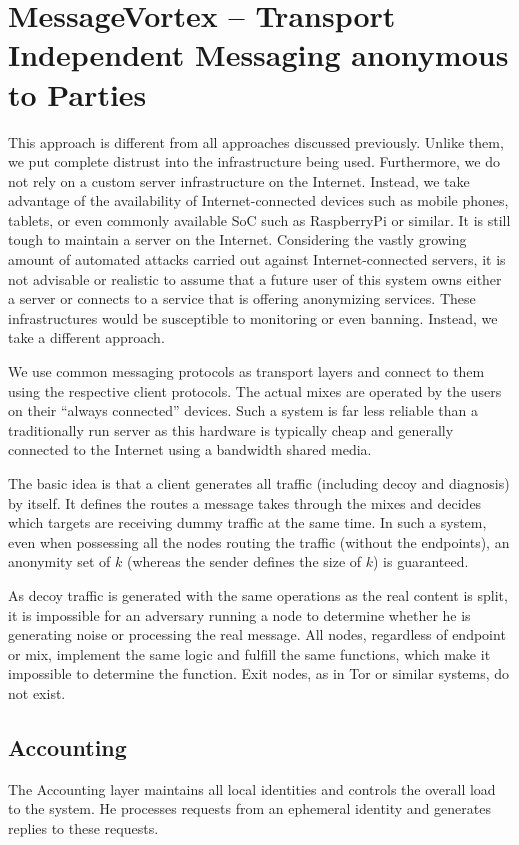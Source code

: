 \chapter{MessageVortex -- Transport Independent Messaging anonymous to \texorpdfstring{}{3rd} Parties\label{sec:spec}}
This approach is different from all approaches discussed previously. Unlike them, we put complete distrust into the infrastructure being used. Furthermore, we do not rely on a custom server infrastructure on the Internet. Instead, we take advantage of the availability of Internet-connected devices such as mobile phones, tablets, or even commonly available SoC such as RaspberryPi or similar. It is still tough to maintain a server on the Internet. Considering the vastly growing amount of automated attacks carried out against Internet-connected servers, it is not advisable or realistic to assume that a future user of this system owns either a server or connects to a service that is offering anonymizing services. These infrastructures would be susceptible to monitoring or even banning. Instead, we take a different approach.

We use common messaging protocols as transport layers and connect to them using the respective client protocols. The actual mixes are operated by the users on their ``always connected'' devices. Such a system is far less reliable than a traditionally run server as this hardware is typically cheap and generally connected to the Internet using a bandwidth shared media.

The basic idea is that a client generates all traffic (including decoy and diagnosis) by itself. It defines the routes a message takes through the mixes and decides which targets are receiving dummy traffic at the same time. In such a system, even when possessing all the nodes routing the traffic (without the endpoints), an anonymity set of $k$ (whereas the sender defines the size of $k$) is guaranteed.

As decoy traffic is generated with the same operations as the real content is split, it is impossible for an adversary running a node to determine whether he is generating noise or processing the real message.
All nodes, regardless of endpoint or mix, implement the same logic and fulfill the same functions, which make it impossible to determine the function. Exit nodes, as in Tor or similar systems, do not exist.

\section{Accounting}
The Accounting layer maintains all local identities and controls the overall load to the system. He processes requests from an ephemeral identity and generates replies to these requests. 

